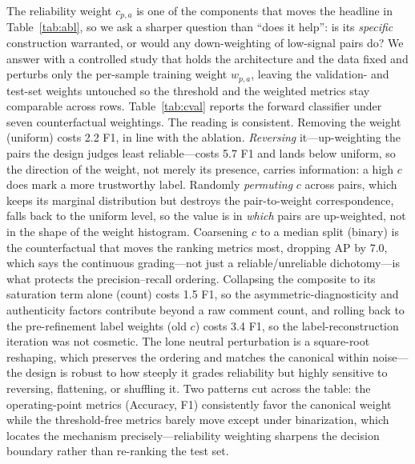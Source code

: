 \documentclass[11pt]{article}
\begin{document}
The reliability weight $c_{p,a}$ is one of the components that moves the headline
in Table~\ref{tab:abl}, so we ask a sharper question than ``does it help'': is its
\emph{specific} construction warranted, or would any down-weighting of low-signal
pairs do? We answer with a controlled study that holds the architecture and the
data fixed and perturbs only the per-sample training weight $w_{p,a}$, leaving
the validation- and test-set weights untouched so the threshold and the
weighted metrics stay comparable across rows. Table~\ref{tab:cval} reports the
forward classifier under seven counterfactual weightings. The reading is
consistent. Removing the weight (uniform) costs 2.2 F1, in line with the
ablation. \emph{Reversing} it---up-weighting the pairs the design judges
least reliable---costs 5.7 F1 and lands below uniform, so the direction of the
weight, not merely its presence, carries information: a high $c$ does mark a
more trustworthy label. Randomly \emph{permuting} $c$ across pairs, which keeps
its marginal distribution but destroys the pair-to-weight correspondence, falls
back to the uniform level, so the value is in \emph{which} pairs are
up-weighted, not in the shape of the weight histogram. Coarsening $c$ to a
median split (binary) is the counterfactual that moves the ranking metrics most,
dropping AP by 7.0, which says the continuous grading---not just a
reliable/unreliable dichotomy---is what protects the precision--recall ordering.
Collapsing the composite to its saturation term alone (count) costs 1.5 F1, so
the asymmetric-diagnosticity and authenticity factors contribute beyond a raw
comment count, and rolling back to the pre-refinement label weights (old $c$)
costs 3.4 F1, so the label-reconstruction iteration was not cosmetic. The lone
neutral perturbation is a square-root reshaping, which preserves the ordering
and matches the canonical within noise---the design is robust to how steeply it
grades reliability but highly sensitive to reversing, flattening, or
shuffling it. Two patterns cut across the table: the operating-point metrics
(Accuracy, F1) consistently favor the canonical weight while the threshold-free
metrics barely move except under binarization, which locates the mechanism
precisely---reliability weighting sharpens the decision boundary rather than
re-ranking the test set.
\end{document}
